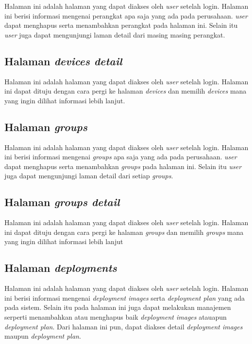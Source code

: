 Halaman ini adalah halaman yang dapat diakses oleh \textit{user} setelah login. Halaman ini berisi informasi mengenai perangkat apa saja yang ada pada perusahaan. \textit{user} dapat menghapus serta menambahkan perangkat pada halaman ini. Selain itu \textit{user} juga dapat mengunjungi laman detail dari masing masing perangkat.

\subsection{Halaman \textit{devices detail}}

Halaman ini adalah halaman yang dapat diakses oleh \textit{user} setelah login. Halaman ini dapat dituju dengan cara pergi ke halaman \textit{devices} dan memilih \textit{devices} mana yang ingin dilihat informasi lebih lanjut.

\subsection{Halaman \textit{groups}}

Halaman ini adalah halaman yang dapat diakses oleh \textit{user} setelah login. Halaman ini berisi informasi mengenai \textit{groups} apa saja yang ada pada perusahaan. \textit{user} dapat menghapus serta menambahkan \textit{groups} pada halaman ini. Selain itu \textit{user} juga dapat mengunjungi laman detail dari setiap \textit{groups}.

\subsection{Halaman \textit{groups detail}}

Halaman ini adalah halaman yang dapat diakses oleh \textit{user} setelah login. Halaman ini dapat dituju dengan cara pergi ke halaman \textit{groups} dan memilih \textit{groups} mana yang ingin dilihat informasi lebih lanjut

\subsection{Halaman \textit{deployments}}

Halaman ini adalah halaman yang dapat diakses oleh \textit{user} setelah login. Halaman ini berisi informasi mengenai \textit{deployment images} serta \textit{deployment plan} yang ada pada sistem. Selain itu pada halaman ini juga dapat melakukan manajemen serperti menambahkan atau menghapus baik \textit{deployment images} atauapun \textit{deployment plan}. Dari halaman ini pun, dapat diakses detail \textit{deployment images} maupun \textit{deployment plan}.

